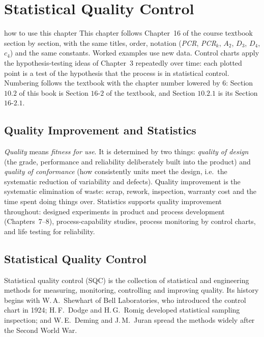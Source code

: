 \chapter{Statistical Quality Control}

\begin{nuance}{how to use this chapter}
This chapter follows Chapter~16 of the course textbook section by section, with the same titles, order, notation (\emph{PCR}, \emph{PCR}$_k$, $A_2$, $D_3$, $D_4$, $c_4$) and the same constants. Worked examples use new data. Control charts apply the hypothesis-testing ideas of Chapter~3 repeatedly over time: each plotted point is a test of the hypothesis that the process is in statistical control. Numbering follows the textbook with the chapter number lowered by $6$: Section $10.2$ of this book is Section $16$-$2$ of the textbook, and Section $10.2.1$ is its Section $16$-$2.1$.
\end{nuance}

\section{Quality Improvement and Statistics}

\emph{Quality} means \emph{fitness for use}. It is determined by two things: \emph{quality of design} (the grade, performance and reliability deliberately built into the product) and \emph{quality of conformance} (how consistently units meet the design, i.e.\ the systematic reduction of variability and defects). Quality improvement is the systematic elimination of waste: scrap, rework, inspection, warranty cost and the time spent doing things over. Statistics supports quality improvement throughout: designed experiments in product and process development (Chapters~7--8), process-capability studies, process monitoring by control charts, and life testing for reliability.

\section{Statistical Quality Control}

Statistical quality control (SQC) is the collection of statistical and engineering methods for measuring, monitoring, controlling and improving quality. Its history begins with W.\,A.\ Shewhart of Bell Laboratories, who introduced the control chart in 1924; H.\,F.\ Dodge and H.\,G.\ Romig developed statistical sampling inspection; and W.\,E.\ Deming and J.\,M.\ Juran spread the methods widely after the Second World War.


